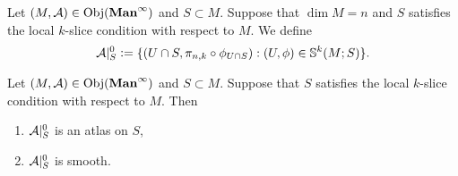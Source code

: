 \documentclass{book}
\begin{document}
	\begin{defn}
		Let $(M, \mathcal{A}) \in \operatorname{Obj}(\operatorname*{\text{\textbf{Man}}^{\infty}})$ and $S \subset M$. Suppose that $\dim M = n$ and $S$ satisfies the local $k$-slice condition with respect to $M$. We define 
		$$\mathcal{A}|_S^0 \vcentcolon= \{(U \cap S, \pi_{n,k} \circ \phi_{U \cap S}): (U, \phi) \in \mathbb{S}^k(M; S)\}.$$
	\end{defn}

	\begin{ex}
		Let $(M, \mathcal{A}) \in \operatorname{Obj}(\operatorname*{\text{\textbf{Man}}^{\infty}})$ and $S \subset M$. Suppose that $S$ satisfies the local $k$-slice condition with respect to $M$. Then 
		\begin{enumerate}
			\item $\mathcal{A}|_S^0$ is an atlas on $S$,
			\item $\mathcal{A}|_S^0$ is smooth.
		\end{enumerate}
	\end{ex}
	
\end{document}
